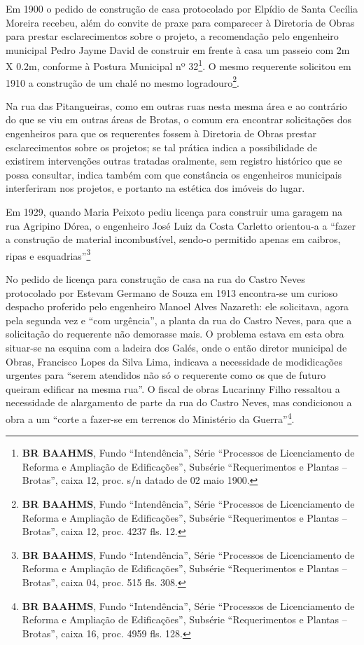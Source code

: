 Em 1900 o pedido de construção de casa protocolado por Elpídio de Santa Cecília Moreira recebeu, além do convite de praxe para comparecer à Diretoria de Obras para prestar esclarecimentos sobre o projeto, a recomendação pelo engenheiro municipal Pedro Jayme David de construir em frente à casa um passeio com 2m X 0.2m, conforme à Postura Municipal nº 32\footnote{\textbf{BR BAAHMS}, Fundo ``Intendência'', Série ``Processos de Licenciamento de Reforma e Ampliação de Edificações'', Subsérie ``Requerimentos e Plantas -- Brotas'', caixa 12, proc. s/n datado de 02 maio 1900.}. O mesmo requerente solicitou em 1910 a construção de um chalé no mesmo logradouro\footnote{\textbf{BR BAAHMS}, Fundo ``Intendência'', Série ``Processos de Licenciamento de Reforma e Ampliação de Edificações'', Subsérie ``Requerimentos e Plantas -- Brotas'', caixa 12, proc. 4237 fls. 12.}.

Na rua das Pitangueiras, como em outras ruas nesta mesma área e ao contrário do que se viu em outras áreas de Brotas, o comum era encontrar solicitações dos engenheiros para que os requerentes fossem à Diretoria de Obras prestar esclarecimentos sobre os projetos; se tal prática indica a possibilidade de existirem intervenções outras tratadas oralmente, sem registro histórico que se possa consultar, indica também com que constância os engenheiros municipais interferiram nos projetos, e portanto na estética dos imóveis do lugar.

Em 1929, quando Maria Peixoto pediu licença para construir uma garagem na rua Agripino Dórea, o engenheiro José Luiz da Costa Carletto orientou-a a ``fazer a construção de material incombustível, sendo-o permitido apenas em caibros, ripas e esquadrias''\footnote{\textbf{BR BAAHMS}, Fundo ``Intendência'', Série ``Processos de Licenciamento de Reforma e Ampliação de Edificações'', Subsérie ``Requerimentos e Plantas -- Brotas'', caixa 04, proc. 515 fls. 308.}

No pedido de licença para construção de casa na rua do Castro Neves protocolado por Estevam Germano de Souza em 1913 encontra-se um curioso despacho proferido pelo engenheiro Manoel Alves Nazareth: ele solicitava, agora pela segunda vez e ``com urgência'', a planta da rua do Castro Neves, para que a solicitação do requerente não demorasse mais. O problema estava em esta obra situar-se na esquina com a ladeira dos Galés, onde o então diretor municipal de Obras, Francisco Lopes da Silva Lima, indicava a necessidade de modidicações urgentes para ``serem atendidos não só o requerente como os que de futuro queiram edificar na mesma rua''. O fiscal de obras Lucarinny Filho ressaltou a necessidade de alargamento de parte da rua do Castro Neves, mas condicionou a obra a um ``corte a fazer-se em terrenos do Ministério da Guerra''\footnote{\textbf{BR BAAHMS}, Fundo ``Intendência'', Série ``Processos de Licenciamento de Reforma e Ampliação de Edificações'', Subsérie ``Requerimentos e Plantas -- Brotas'', caixa 16, proc. 4959 fls. 128.}.


